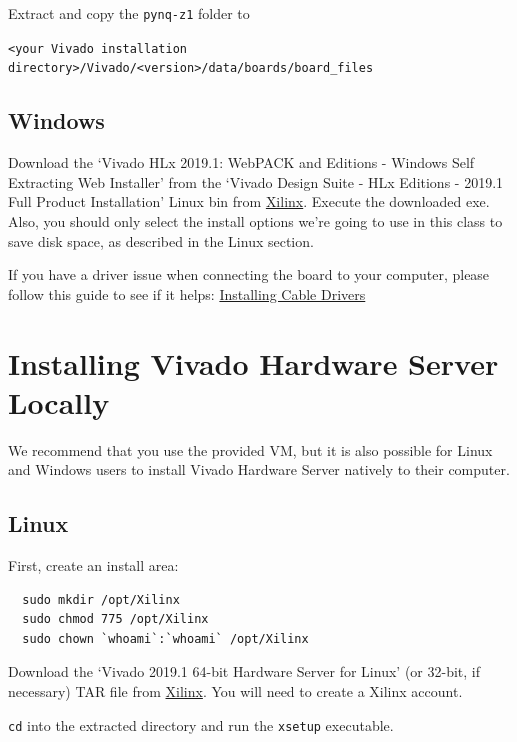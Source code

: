 \documentclass[11pt]{article}
\begin{document}
Extract and copy the \verb|pynq-z1| folder to

\texttt{<your Vivado installation directory>/Vivado/<version>/data/boards/board\_files}

\subsection{Windows}
Download the `Vivado HLx 2019.1: WebPACK and Editions - Windows Self Extracting Web Installer' from the `Vivado Design Suite - HLx Editions - 2019.1  Full Product Installation' Linux bin from \href{https://www.xilinx.com/support/download/index.html/content/xilinx/en/downloadNav/vivado-design-tools/archive.html}{Xilinx}.
Execute the downloaded exe.
Also, you should only select the install options we're going to use in this class to save disk space, as described in the Linux section.

If you have a driver issue when connecting the board to your computer, please follow this guide to see if it helps: \href{https://forums.xilinx.com/t5/Design-and-Debug-Techniques-Blog/Manually-installing-Cable-Drivers-for-Xilinx-Platform-Cable-USB/ba-p/992593}{Installing Cable Drivers}

\section{Installing Vivado Hardware Server Locally}
\label{section:localserver}

We recommend that you use the provided VM, but it is also possible for Linux and Windows users to install Vivado Hardware Server natively to their computer.

\subsection{Linux}
First, create an install area:
\begin{verbatim}
  sudo mkdir /opt/Xilinx
  sudo chmod 775 /opt/Xilinx
  sudo chown `whoami`:`whoami` /opt/Xilinx
\end{verbatim}

Download the `Vivado 2019.1 64-bit Hardware Server for Linux' (or 32-bit, if necessary) TAR file from \href{https://www.xilinx.com/support/download/index.html/content/xilinx/en/downloadNav/vivado-design-tools/archive.html}{Xilinx}.
You will need to create a Xilinx account.

\texttt{cd} into the extracted directory and run the \texttt{xsetup} executable.
\end{document}
